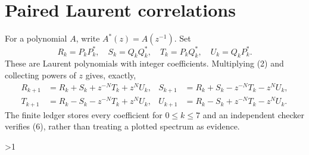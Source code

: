 \documentclass[10pt]{article}
\begin{document}
\section{Paired Laurent correlations}
For a polynomial $A$, write $A^*(z)=A(z^{-1})$.  Set
\[
 R_k=P_kP_k^*,\quad S_k=Q_kQ_k^*,\quad
 T_k=P_kQ_k^*,\quad U_k=Q_kP_k^* .                              \tag{5}
\]
These are Laurent polynomials with integer coefficients.  Multiplying (2)
and collecting powers of $z$ gives, exactly,
\begin{align*}
 R_{k+1}&=R_k+S_k+z^{-N}T_k+z^NU_k,&
 S_{k+1}&=R_k+S_k-z^{-N}T_k-z^NU_k,\\
 T_{k+1}&=R_k-S_k-z^{-N}T_k+z^NU_k,&
 U_{k+1}&=R_k-S_k+z^{-N}T_k-z^NU_k.                    \tag{6}
\end{align*}
The finite ledger stores every coefficient for $0\leq k\leq7$ and an
independent checker verifies (6), rather than treating a plotted spectrum as
evidence.
\fi

\ifnum\CRevisionRound>1
\end{document}
